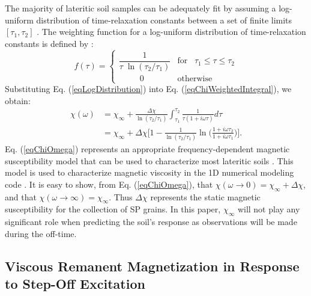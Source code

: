 \documentclass[onecolumn]{IEEEtran} %
\begin{document}
The majority of lateritic soil samples can be adequately fit by assuming a log-uniform distribution of time-relaxation constants between a set of finite limits $[\tau_1, \tau_2]$ \citep{Dabas1992,Mullins1973,Worm1998,Igel2012}. The weighting function for a log-uniform distribution of time-relaxation constants is defined by \citep{Dabas1992,Mullins1973,Billings2003,Das2006}:
\begin{equation}
\label{eqLogDistribution}
f({\tau}) =
\begin{cases}
\dfrac{1}{\tau \; \ln(\tau_2/\tau_1)} & \textrm{for} \; \; \; \tau_1 \leq \tau \leq \tau_2 \\
\; \; \; \; \; \; \; \; \; 0 & \textrm{otherwise}
\end{cases}
\end{equation}
Substituting Eq. (\ref{eqLogDistribution}) into Eq. (\ref{eqChiWeightedIntegral}), we obtain:
\begin{equation}
\begin{split}
\chi (\omega) & = \chi_\infty + \frac{\Delta \chi}{\ln (\tau_2 /\tau_1)} \int_{\tau_1}^{\tau_2} \frac{1}{\tau (1 + i\omega \tau)} d\tau  \\
&= \chi_\infty + \Delta \chi \Bigg [ 1 - \frac{1}{\ln
(\tau_2/\tau_1)} \ln \Bigg ( \frac{1 + i\omega\tau_2}{1 +
i\omega\tau_1} \Bigg ) \Bigg ].
\end{split}
 \label{eqChiOmega}
\end{equation}
Eq. (\ref{eqChiOmega}) represents an appropriate frequency-dependent magnetic susceptibility model that can be used to characterize most lateritic soils \cite{Mullins1973,Lee1984,Worm1998,Dabas1992,Pasion2007}. This model is used to characterize magnetic viscosity in the 1D numerical modeling code \cite{EM1DTM}. It is easy to show, from Eq. (\ref{eqChiOmega}), that $\chi (\omega \rightarrow 0) = \chi_\infty + \Delta \chi$, and that $\chi (\omega\rightarrow \infty) = \chi_\infty$. Thus $\Delta \chi$ represents the static magnetic susceptibility for the collection of SP grains. In this paper, $\chi_\infty$ will not play any significant role when predicting the soil's response as observations will be made during the off-time.



\subsection{Viscous Remanent Magnetization in Response to Step-Off Excitation}
\end{document}
